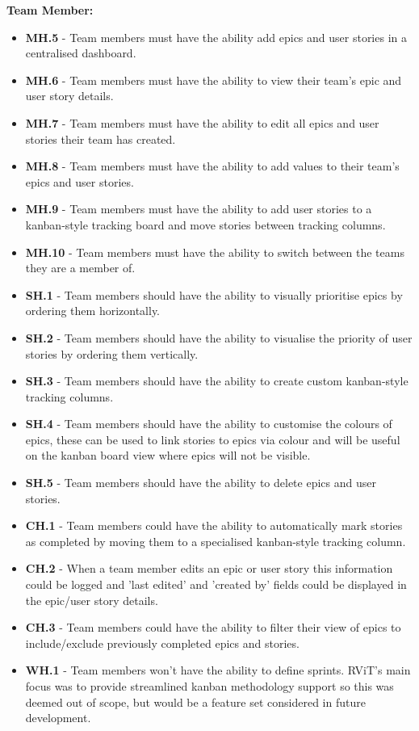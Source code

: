 \documentclass[l4proj.tex]{subfiles}
\begin{document}
\textbf{Team Member:}
\begin{itemize}
     \item \textbf{MH.5} - Team members must have the ability add epics and user stories in a centralised dashboard. 
     \item \textbf{MH.6} - Team members must have the ability to view their team's epic and user story details. 
     \item \textbf{MH.7} - Team members must have the ability to edit all epics and user stories their team has created. 
     \item \textbf{MH.8} - Team members must have the ability to add values to their team's epics and user stories. 
     \item \textbf{MH.9} - Team members must have the ability to add user stories to a kanban-style tracking board and move stories between tracking columns.
     \item \textbf{MH.10} - Team members must have the ability to switch between the teams they are a member of. \\

    \item \textbf{SH.1} - Team members should have the ability to visually prioritise epics by ordering them horizontally. 
    \item \textbf{SH.2} - Team members should have the ability to visualise the priority of user stories by ordering them vertically. 
    \item \textbf{SH.3} - Team members should have the ability to create custom kanban-style tracking columns.
    \item \textbf{SH.4} - Team members should have the ability to customise the colours of epics, these can be used to link stories to epics via colour and will be useful on the kanban board view where epics will not be visible.
    \item \textbf{SH.5} - Team members should have the ability to delete epics and user stories.\\

    \item \textbf{CH.1} - Team members could have the ability to automatically mark stories as completed by moving them to a specialised kanban-style tracking column.
    \item \textbf{CH.2} - When a team member edits an epic or user story this information could be logged and 'last edited' and 'created by' fields could be displayed in the epic/user story details.
    \item \textbf{CH.3} - Team members could have the ability to filter their view of epics to include/exclude previously completed epics and stories. \\

    \item \textbf{WH.1} - Team members won't have the ability to define sprints. RViT's main focus was to provide streamlined kanban methodology support so this was deemed out of scope, but would be a feature set considered in future development.\\
\end{itemize}
\hfill
\end{document}
